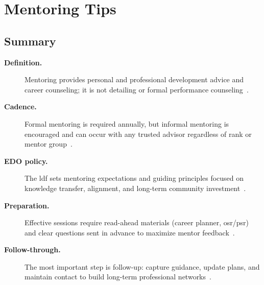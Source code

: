 \documentclass[../main.tex]{subfiles}
\begin{document}
\section{Mentoring Tips}

\subsection{Summary}
\begin{description}
  \item[\textbf{Definition.}] Mentoring provides personal and professional development advice and
  career counseling; it is not detailing or formal performance counseling~\autocite{edo-5-2-6-mentoring-tips-2025}.
  \item[\textbf{Cadence.}] Formal mentoring is required annually, but informal mentoring is encouraged and
  can occur with any trusted advisor regardless of rank or mentor group~\autocite{edo-5-2-6-mentoring-tips-2025}.
  \item[\textbf{EDO policy.}] The \ac{ldf} sets mentoring expectations and guiding principles focused on
  knowledge transfer, alignment, and long-term community investment~\autocite{edo-5-2-6-mentoring-tips-2025}.
  \item[\textbf{Preparation.}] Effective sessions require read-ahead materials (career planner, \ac{osr}/\ac{psr})
  and clear questions sent in advance to maximize mentor feedback~\autocite{edo-5-2-6-mentoring-tips-2025}.
  \item[\textbf{Follow-through.}] The most important step is follow-up: capture guidance, update plans, and
  maintain contact to build long-term professional networks~\autocite{edo-5-2-6-mentoring-tips-2025}.
\end{description}
\end{document}
